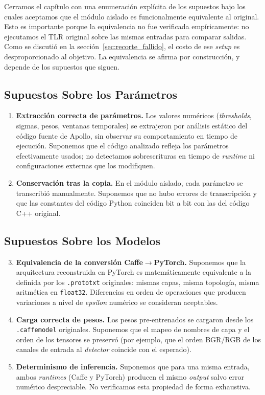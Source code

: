 Cerramos el capítulo con una enumeración explícita de los supuestos bajo los cuales aceptamos que el módulo aislado es funcionalmente equivalente al original. Esto es importante porque la equivalencia no fue verificada empíricamente: no ejecutamos el TLR original sobre las mismas entradas para comparar salidas. Como se discutió en la sección~\ref{sec:recorte_fallido}, el costo de ese \textit{setup} es desproporcionado al objetivo. La equivalencia se afirma por construcción, y depende de los supuestos que siguen.

\subsection{Supuestos Sobre los Parámetros}

\begin{enumerate}
    \item \textbf{Extracción correcta de parámetros.} Los valores numéricos (\textit{thresholds}, sigmas, pesos, ventanas temporales) se extrajeron por análisis estático del código fuente de Apollo, sin observar su comportamiento en tiempo de ejecución. Suponemos que el código analizado refleja los parámetros efectivamente usados; no detectamos sobrescrituras en tiempo de \textit{runtime} ni configuraciones externas que los modifiquen.

    \item \textbf{Conservación tras la copia.} En el módulo aislado, cada parámetro se transcribió manualmente. Suponemos que no hubo errores de transcripción y que las constantes del código Python coinciden bit a bit con las del código C++ original.
\end{enumerate}

\subsection{Supuestos Sobre los Modelos}

\begin{enumerate}
    \setcounter{enumi}{2}
    \item \textbf{Equivalencia de la conversión Caffe$\to$PyTorch.} Suponemos que la arquitectura reconstruida en PyTorch es matemáticamente equivalente a la definida por los \texttt{.prototxt} originales: mismas capas, misma topología, misma aritmética en \texttt{float32}. Diferencias en orden de operaciones que producen variaciones a nivel de \textit{epsilon} numérico se consideran aceptables.

    \item \textbf{Carga correcta de pesos.} Los pesos pre-entrenados se cargaron desde los \texttt{.caffemodel} originales. Suponemos que el mapeo de nombres de capa y el orden de los tensores se preservó (por ejemplo, que el orden BGR/RGB de los canales de entrada al \textit{detector} coincide con el esperado).

    \item \textbf{Determinismo de inferencia.} Suponemos que para una misma entrada, ambos \textit{runtimes} (Caffe y PyTorch) producen el mismo \textit{output} salvo error numérico despreciable. No verificamos esta propiedad de forma exhaustiva.
\end{enumerate}

